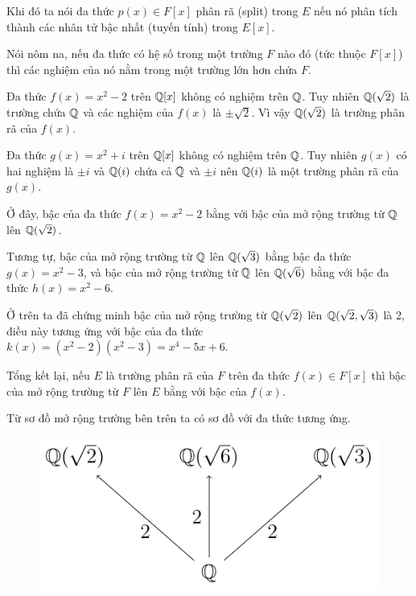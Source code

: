 Khi đó ta nói đa thức $p(x) \in F[x]$ phân rã (split) trong $E$ nếu nó phân tích thành các nhân tử bậc nhất (tuyến tính) trong $E[x]$.

Nói nôm na, nếu đa thức có hệ số trong một trường $F$ nào đó (tức thuộc $F[x]$) thì các nghiệm của nó nằm trong một trường lớn hơn chứa $F$.

\begin{example}
    Đa thức $f(x) = x^2 - 2$ trên $\mathbb{Q}[x]$ không có nghiệm trên $\mathbb{Q}$. Tuy nhiên $\mathbb{Q}(\sqrt{2})$ là trường chứa $\mathbb{Q}$ và các nghiệm của $f(x)$ là $\pm \sqrt{2}$. Vì vậy $\mathbb{Q}(\sqrt{2})$ là trường phân rã của $f(x)$.
\end{example}

\begin{example}
    Đa thức $g(x) = x^2 + i$ trên $\mathbb{Q}[x]$ không có nghiệm trên $\mathbb{Q}$. Tuy nhiên $g(x)$ có hai nghiệm là $\pm i$ và $\mathbb{Q}(i)$ chứa cả $\mathbb{Q}$ và $\pm i$ nên $\mathbb{Q}(i)$ là một trường phân rã của $g(x)$.
\end{example}

Ở đây, bậc của đa thức $f(x) = x^2 - 2$ bằng với bậc của mở rộng trường từ $\mathbb{Q}$ lên $\mathbb{Q}(\sqrt{2})$.

Tương tự, bậc của mở rộng trường từ $\mathbb{Q}$ lên $\mathbb{Q}(\sqrt{3})$ bằng bậc đa thức $g(x) = x^2 - 3$, và bậc của mở rộng trường từ $\mathbb{Q}$ lên $\mathbb{Q}(\sqrt{6})$ bằng với bậc đa thức $h(x) = x^2 - 6$.

Ở trên ta đã chứng minh bậc của mở rộng trường từ $\mathbb{Q}(\sqrt{2})$ lên $\mathbb{Q}(\sqrt{2}, \sqrt{3})$ là 2, điều này tương ứng với bậc của đa thức $k(x) = (x^2 - 2)(x^2 - 3) = x^4 - 5 x + 6$.

Tổng kết lại, nếu $E$ là trường phân rã của $F$ trên đa thức $f(x) \in F[x]$ thì bậc của mở rộng trường từ $F$ lên $E$ bằng với bậc của $f(x)$.

Từ sơ đồ mở rộng trường bên trên ta có sơ đồ với đa thức tương ứng.

\begin{figure}[htb]
    \centering
    \includegraphics[page=3]{extension_field.pdf}
\end{figure}

